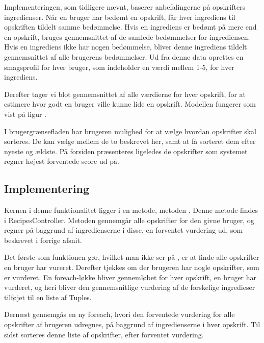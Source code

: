 Implementeringen, som tidligere nævnt, baserer anbefalingerne på opskrifters ingredienser.
Når en bruger har bedømt en opskrift, får hver ingrediens til opskriften tildelt samme bedømmelse.
Hvis en ingrediens er bedømt på mere end en opskrift, bruges gennemsnittet af de samlede bedømmelser for ingrediensen.
Hvis en ingrediens ikke har nogen bedømmelse, bliver denne ingrediens tildelt gennemsnittet af alle brugerens bedømmelser.
Ud fra denne data oprettes en smagsprofil for hver bruger, som indeholder en værdi mellem 1-5, for hver ingrediens.

Derefter tager vi blot gennemsnittet af alle værdierne for hver opskrift, for at estimere hvor godt en bruger ville kunne lide en opskrift.
Modellen fungerer som vist på figur .


I brugergrænsefladen har brugeren mulighed for at vælge hvordan opskrifter skal sorteres.
De kan vælge mellem de to beskrevet her, samt at få sorteret dem efter nyeste og ældste.
På forsiden præsenteres ligeledes de opskrifter som systemet regner højest forventede score ud på.

\subsection{Implementering}
Kernen i denne funktionalitet ligger i en metode, metoden .
Denne metode findes i RecipesController.
Metoden gennemgår alle opskrifter for den givne bruger, og regner på baggrund af ingredienserne i disse, en forventet vurdering ud, som beskrevet i forrige afsnit.

Det første som funktionen gør, hvilket man ikke ser på , er at finde alle opskrifter en bruger har vureret.
Derefter tjekkes om der brugeren har nogle opskrifter, som er vurderet.
En foreach-løkke bliver gennemløbet for hver opskrift, en bruger har vurderet, og heri bliver den gennemsnitlige vurdering af de forskelige ingredieser tilføjet til en liste af Tuples.

Dernæst gennemgås en ny foreach, hvori den forventede vurdering for alle opskrifter af brugeren udregnes, på baggrund af ingredienserne i hver opskrift.
Til sidst sorteres denne liste af opskrifter, efter forventet vurdering.

